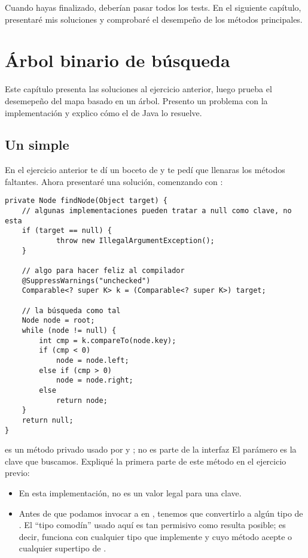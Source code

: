 \documentclass[12pt]{book}
\theoremstyle{exercise}
\begin{document}


Cuando hayas finalizado, deberían pasar todos los tests. En el siguiente
capítulo, presentaré mis soluciones y comprobaré el desempeño de los
métodos principales.


\chapter{Árbol binario de búsqueda}

Este capítulo presenta las soluciones al ejercicio anterior, luego prueba
el desemepeño del mapa basado en un árbol. Presento un problema con la
implementación y explico cómo el  de Java lo resuelve.


\section{Un  simple}
\label{our-version-of-mytreemap}

En el ejercicio anterior te dí un boceto de  y
te pedí que llenaras los métodos faltantes. Ahora presentaré una
solución, comenzando con :


\begin{verbatim}
private Node findNode(Object target) {
    // algunas implementaciones pueden tratar a null como clave, no esta
    if (target == null) {
            throw new IllegalArgumentException();
    }

    // algo para hacer feliz al compilador
    @SuppressWarnings("unchecked")
    Comparable<? super K> k = (Comparable<? super K>) target;

    // la búsqueda como tal
    Node node = root;
    while (node != null) {
        int cmp = k.compareTo(node.key);
        if (cmp < 0)
            node = node.left;
        else if (cmp > 0)
            node = node.right;
        else
            return node;
    }
    return null;
}
\end{verbatim}

 es un método privado usado por  y
; no es parte de la interfaz  El parámero
 es la clave que buscamos. Expliqué la primera parte
de este método en el ejercicio previo:

\begin{itemize}

\item
  En esta implementación,  no es un valor legal para una clave.

\item
  Antes de que podamos invocar a  en , tenemos
  que convertirlo a algún tipo de . El ``tipo comodín''
  usado aquí es tan permisivo como resulta posible; es decir, funciona con
  cualquier tipo que implemente  y cuyo método 
  acepte  o cualquier supertipo de .

\end{itemize}
\end{document}
